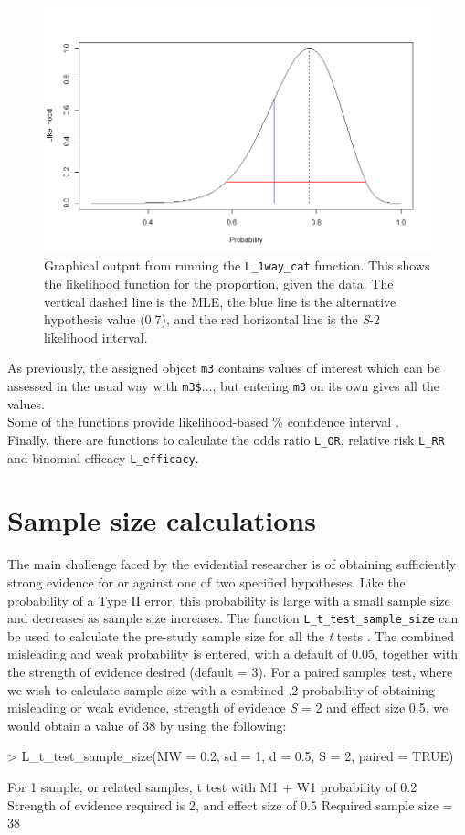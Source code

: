 \begin{figure}[htbp]
\centering
\includegraphics[width=12cm,
  keepaspectratio,]{figure4}
\caption{Graphical output from running the \texttt{L\_1way\_cat} function. This shows the likelihood function for the proportion, given the data. The vertical dashed line is the MLE, the blue line is the alternative hypothesis value (0.7), and the red horizontal line is the \emph{S}-2 likelihood interval.}
\label{figure:figure4}
\end{figure}
As previously, the assigned object \texttt{m3} contains values of interest which can be assessed in the usual way with \texttt{m3\$}..., but entering \texttt{m3} on its own gives all the values.\\
Some of the functions provide likelihood-based \% confidence interval \citep{Aitkin:1989}.\\
Finally, there are functions to calculate the odds ratio \texttt{L\_OR}, relative risk \texttt{L\_RR} and binomial efficacy \texttt{L\_efficacy}.

\section{Sample size calculations}
The main challenge faced by the evidential researcher is of obtaining sufficiently strong evidence for or against one of two specified hypotheses. Like the probability of a Type II error, this probability is large with a small sample size and decreases as sample size increases. The function \texttt{L\_t\_test\_sample\_size} can be used to calculate the pre-study sample size for all the \emph{t} tests \citep{Cahusac:2022}. The combined misleading and weak probability \citep{Royall:1997,Royall:2000,Royall:2004} is entered, with a default of 0.05, together with the strength of evidence desired (default = 3). For a paired samples test, where we wish to calculate sample size with a combined .2 probability of obtaining misleading or weak evidence, strength of evidence \emph{S} = 2 and effect size 0.5, we would obtain a value of 38 by using the following:\\
\begin{example}
> L_t_test_sample_size(MW = 0.2, sd = 1, d = 0.5, S = 2, paired = TRUE)

For 1 sample, or related samples, t test with M1 + W1 probability of 0.2
 Strength of evidence required is 2, and effect size of 0.5
 Required sample size = 38
 \end{example}
 
